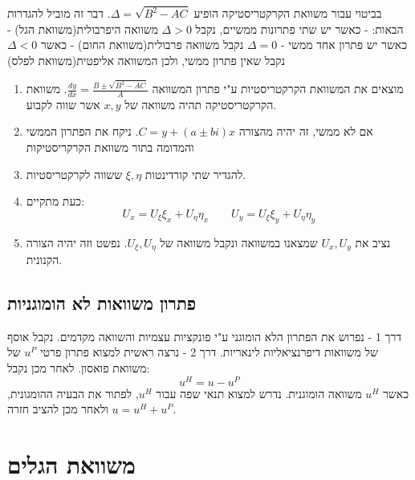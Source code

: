 \documentclass{tstextbook}
\begin{document}
\begin{definition}
בביטוי עבור משוואת הקרקטריסטיקה הופיע \(\Delta=\sqrt{B^2-AC}\). דבר זה מוביל להגדרות הבאות:
- כאשר יש שתי פתרונות ממשיים, נקבל \(\Delta>0\) משוואה היפרבולית(משוואת הגל)
- כאשר יש פתרון אחד ממשי - \(\Delta=0\) נקבל משוואה פרבולית(משוואת החום)
- כאשר \(\Delta<0\) נקבל שאין פתרון ממשי, ולכן המשוואה אליפטית(משוואת לפלס)

\end{definition}
\begin{proposition}
  \begin{enumerate}
    \item מוצאים את המשוואת הקרקטריסטיות ע"י פתרון המשוואה \(\frac{dy}{dx}=\frac{ B\pm \sqrt{ B^2-AC } }{A}\). משוואת הקרקטריסטיקה תהיה משוואה של \(x,y\) אשר שווה לקבוע. 


    \item אם לא ממשי, זה יהיה מהצורה \(C=y+\left( a\pm bi \right)x\). ניקח את הפתרון הממשי והמדומה בתור משוואת הקרקריסטיקות 


    \item להגדיר שתי קורדינטות \(\xi,\eta\) ששווה לקרקטריסטיות. 


    \item כעת מתקיים: 
$$U_{x}=U_{\xi}\xi_{x}+U_{\eta}\eta_{x}\qquad U_{y}=U_{\xi}\xi_{y}+U_{\eta}\eta_{y}$$


    \item נציב את \(U_{x},U_{y}\) שמצאנו במשוואה ונקבל משוואה של \(U_{\xi},U_{\eta}\). נפשט וזה יהיה הצורה הקנונית.  


  \end{enumerate}
\end{proposition}
\subsection{פתרון משוואות לא הומוגניות}

\begin{proposition}
דרך 1 - נפרוש את הפתרון הלא הומוגני ע"י פונקציות עצמיות והשוואה מקדמים. נקבל אוסף של משוואות דיפרנציאליות לינאריות.
דרך 2 - נרצה ראשית למצוא פתרון פרטי \(u^P\) של משוואת פואסון. לאחר מכן נקבל:
$$u^H=u-u^P$$
כאשר \(u^H\) משוואה הומוגנית. נדרש למצוא תנאי שפה עבור \(u^H\), לפתור את הבעיה ההומגונית, ולאחר מכן להציב חזרה \(u=u^H+u^P\).

\end{proposition}
\section{משוואת הגלים}
\end{document}
